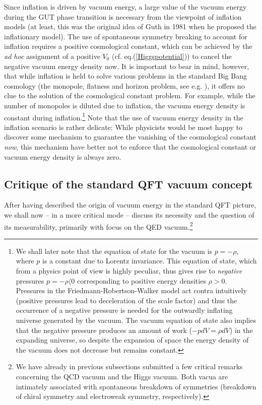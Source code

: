 \documentclass[12pt]{article}
\def\ss{\subsection}
\begin{document}
Since inflation is driven by vacuum energy, a large value of the
vacuum energy during the GUT phase transition is necessary from
the viewpoint of inflation models (at least, this was the original
idea of Guth in 1981 when he proposed the inflationary model). The
use of spontaneous symmetry breaking to account for inflation
requires a positive cosmological constant, which can be achieved
by the {\em ad hoc} assignment of a positive $V_0$ (cf.
eq.(\ref{Higgspotential})) to cancel the negative vacuum energy
density now. It is important to bear in mind, however, that while
inflation is held to solve various problems in the standard Big
Bang cosmology (the monopole, flatness and horizon problem, see
e.g. \cite{earman99}), it offers no clue to the solution of the
cosmological constant problem. For example, while the number of
monopoles is diluted due to inflation, the vacuum energy density
is constant during inflation.\footnote{We shall later note that
the equation of state for the vacuum is $ p = - \rho$, where $p$
is a constant due to Lorentz invariance. This equation of state,
which from a physics point of view is highly peculiar, thus gives
rise to {\em negative} pressures $ p = - \rho \langle 0$ corresponding
to positive energy densities $\rho > 0$. Pressures in the
Friedmann-Robertson-Walker model act contra intuitively (positive
pressures lead to deceleration of the scale factor) and thus the
occurrence of a negative pressure is needed for the outwardly
inflating universe generated by the vacuum. The vacuum equation of
state also implies that the negative pressure produces an amount
of work ($- p dV = \rho dV$) in the expanding universe, so despite
the expansion of space the energy density of the vacuum does not
decrease but remains constant.} Note that the use of vacuum energy
density in the inflation scenario is rather delicate: While
physicists would be most happy to discover some mechanism to
guarantee the vanishing of the cosmological constant {\em now},
this mechanism have better not to enforce that the cosmological
constant or vacuum energy density is always zero.

\ss{Critique of the standard QFT vacuum concept}

After having described the origin of vacuum energy in the standard
QFT picture, we shall now -- in a more critical mode -- discuss
its necessity and the question of its measurability, primarily
with focus on the QED vacuum.\footnote{We have already in previous
subsections submitted a few critical remarks concerning the QCD
vacuum and the Higgs vacuum. Both vacua are intimately associated
with spontaneous breakdown of symmetries (breakdown of chiral
symmetry and electroweak symmetry, respectively).}
\end{document}
